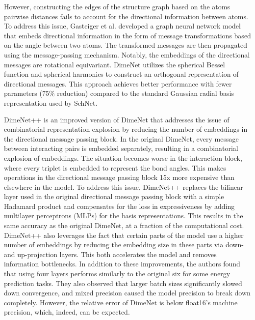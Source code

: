 However, constructing the edges of the structure graph based on the atoms pairwise distances fails to account for the directional information between atoms. To address this issue, Gasteiger et al. \cite{gasteigerDirectionalMessagePassing2022} developed a graph neural network model that embeds directional information in the form of message transformations based on the angle between two atoms. The transformed messages are then propagated using the message-passing mechanism. Notably, the embeddings of the directional messages are rotational equivariant. DimeNet \cite{gasteigerDirectionalMessagePassing2022} utilizes the spherical Bessel function and spherical harmonics to construct an orthogonal representation of directional messages. This approach achieves better performance with fewer parameters (75\% reduction) compared to the standard Gaussian radial basis representation used by SchNet.

DimeNet++ \cite{gasteigerFastUncertaintyAwareDirectional2022} is an improved version of DimeNet that addresses the issue of combinatorial representation explosion by reducing the number of embeddings in the directional message passing block.
In the original DimeNet, every message between interacting pairs is embedded separately, resulting in a combinatorial explosion of embeddings. The situation becomes worse in the interaction block, where every triplet is embedded to represent the bond angles. This makes operations in the directional message passing block 15x more expensive than elsewhere in the model. To address this issue, DimeNet++ replaces the bilinear layer used in the original directional message passing block with a simple Hadamard product and compensates for the loss in expressiveness by adding multilayer perceptrons (MLPs) for the basis representations. This results in the same accuracy as the original DimeNet, at a fraction of the computational cost.
DimeNet++ also leverages the fact that certain parts of the model use a higher number of embeddings by reducing the embedding size in these parts via down- and up-projection layers. This both accelerates the model and removes information bottlenecks.
In addition to these improvements, the authors found that using four layers performs similarly to the original six for some energy prediction tasks. They also observed that larger batch sizes significantly slowed down convergence, and mixed precision caused the model precision to break down completely. However, the relative error of DimeNet is below float16's machine precision, which, indeed, can be expected.

